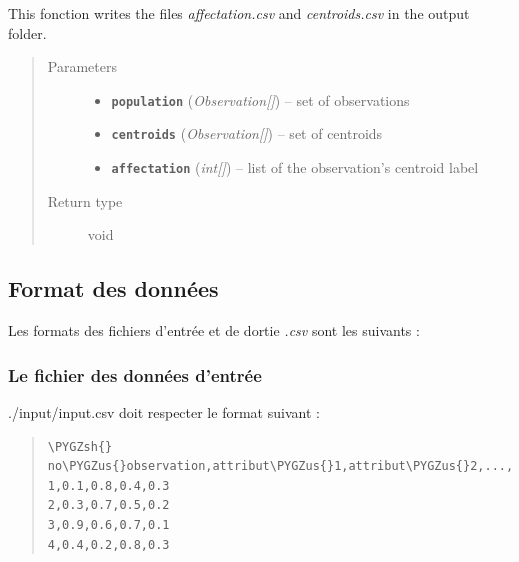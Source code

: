 \documentclass[letterpaper,10pt,english]{sphinxmanual}
\def\PYGZus{\char`\_}
\def\PYGZsh{\char`\#}
\begin{document}
\begin{fulllineitems}
\label{data:es.write_kmeans_output}
This fonction writes the files \emph{affectation.csv} and \emph{centroids.csv} in the output folder.
\begin{quote}\begin{description}
\item[{Parameters}] \leavevmode\begin{itemize}
\item {} 
\textbf{\texttt{population}} (\emph{Observation{[}{]}}) -- set of observations

\item {} 
\textbf{\texttt{centroids}} (\emph{Observation{[}{]}}) -- set of centroids

\item {} 
\textbf{\texttt{affectation}} (\emph{int{[}{]}}) -- list of the observation's centroid label

\end{itemize}

\item[{Return type}] \leavevmode
void

\end{description}\end{quote}

\end{fulllineitems}



\subsection{Format des données}
\label{data:format-des-donnees}\label{data:format}
Les formats des fichiers d'entrée et de dortie \emph{.csv} sont les suivants :


\subsubsection{Le fichier des données d’entrée}
\label{data:le-fichier-des-donnees-dentree}
./input/input.csv doit respecter le format suivant :
\begin{quote}

\begin{Verbatim}[commandchars=\\\{\}]
\PYGZsh{} no\PYGZus{}observation,attribut\PYGZus{}1,attribut\PYGZus{}2,...,attribut\PYGZus{}p
1,0.1,0.8,0.4,0.3
2,0.3,0.7,0.5,0.2
3,0.9,0.6,0.7,0.1
4,0.4,0.2,0.8,0.3
\end{Verbatim}
\end{quote}
\end{document}
